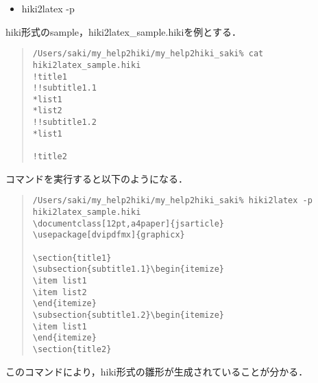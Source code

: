 \begin{itemize}
\item hiki2latex -p
\end{itemize}
\begin{description}
\item hiki形式のsample，hiki2latex\_sample.hikiを例とする．
\end{description}
\begin{quote}\begin{verbatim}
/Users/saki/my_help2hiki/my_help2hiki_saki% cat hiki2latex_sample.hiki 
!title1
!!subtitle1.1
*list1
*list2
!!subtitle1.2
*list1

!title2
\end{verbatim}\end{quote}
\begin{description}
\item コマンドを実行すると以下のようになる．
\end{description}
\begin{quote}\begin{verbatim}
/Users/saki/my_help2hiki/my_help2hiki_saki% hiki2latex -p hiki2latex_sample.hiki
\documentclass[12pt,a4paper]{jsarticle}
\usepackage[dvipdfmx]{graphicx}

\section{title1}
\subsection{subtitle1.1}\begin{itemize}
\item list1
\item list2
\end{itemize}
\subsection{subtitle1.2}\begin{itemize}
\item list1
\end{itemize}
\section{title2}

\end{verbatim}\end{quote}
\begin{description}
\item このコマンドにより，hiki形式の雛形が生成されていることが分かる．
\end{description}

